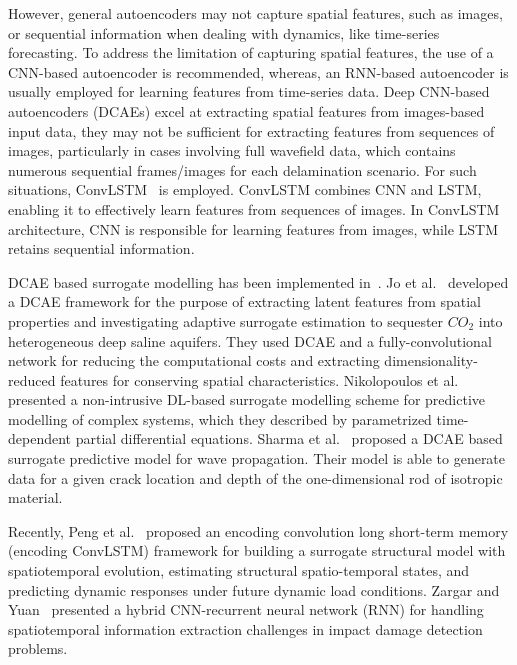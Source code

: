 However, general autoencoders may not capture spatial features, such as images, or sequential information when dealing with dynamics, like time-series forecasting. 
To address the limitation of capturing spatial features, the use of a CNN-based autoencoder is recommended, whereas, an RNN-based autoencoder is usually employed for learning features from time-series data.
Deep CNN-based autoencoders (DCAEs) excel at extracting spatial features from images-based input data, they may not be sufficient for extracting features from sequences of images, particularly in cases involving full wavefield data, which contains numerous sequential frames/images for each delamination scenario. 
For such situations, ConvLSTM~\cite{shi2015convolutional} is employed. 
ConvLSTM combines CNN and LSTM, enabling it to effectively learn features from sequences of images. 
In ConvLSTM architecture, CNN is responsible for learning features from images, while LSTM retains sequential information.

DCAE based surrogate modelling has been implemented in~\cite{jo2021adaptive, nikolopoulos2022non, sharma2022wave}. 
Jo et al.~\cite{jo2021adaptive} developed a DCAE framework for the purpose of extracting latent features from spatial properties and investigating adaptive surrogate estimation to sequester $CO_2$ into heterogeneous deep saline aquifers. 
They used DCAE and a fully-convolutional network for reducing the computational costs and extracting dimensionality-reduced features for conserving spatial characteristics. 
Nikolopoulos et al.~\cite{nikolopoulos2022non} presented a non-intrusive DL-based surrogate modelling scheme for predictive modelling of complex systems, which they described by parametrized time-dependent partial differential equations. 
Sharma et al.~\cite{sharma2022wave} proposed a DCAE based surrogate predictive model for wave propagation. 
Their model is able to generate data for a given crack location and depth of the one-dimensional rod of isotropic material.

Recently, Peng et al.~\cite{peng2021structural} proposed an encoding convolution long short-term memory (encoding ConvLSTM) framework for building a surrogate structural model with spatiotemporal evolution, estimating structural spatio-temporal states, and predicting dynamic responses under future dynamic load conditions. 
Zargar and Yuan~\cite{zargar2021impact} presented a hybrid CNN-recurrent neural network (RNN) for handling spatiotemporal information extraction challenges in impact damage detection problems.

